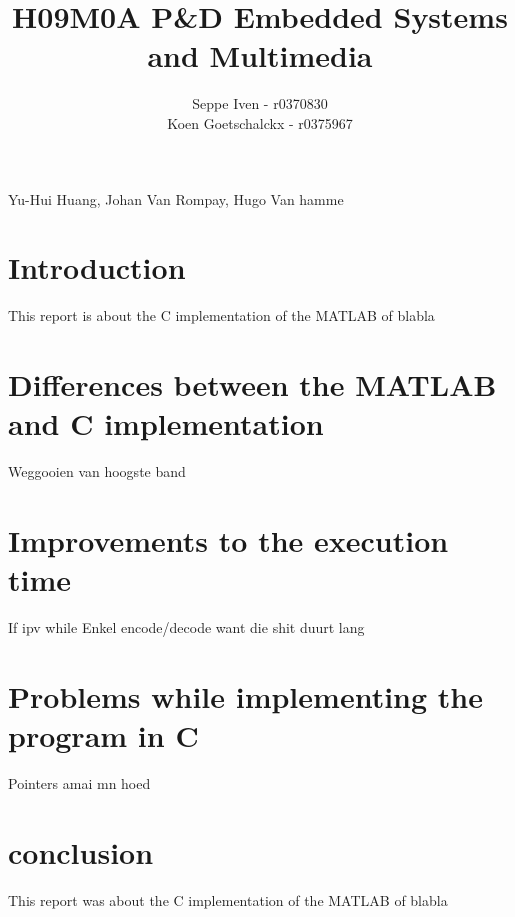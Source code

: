 \documentclass[a4paper]{article}
\title{H09M0A P\&D Embedded Systems and Multimedia}
\author{Seppe Iven - r0370830 \\ Koen Goetschalckx - r0375967}
\begin{document}
 
\maketitle
\begin{center} Yu-Hui Huang, Johan Van Rompay, Hugo Van hamme
\end{center}

\section{Introduction}
This report is about the C implementation of the MATLAB of blabla

\section{Differences between the MATLAB and C implementation}
Weggooien van hoogste band

\section{Improvements to the execution time}
If ipv while
Enkel encode/decode want die shit duurt lang

\section{Problems while implementing the program in C}
Pointers amai mn hoed

\section{conclusion}
This report was about the C implementation of the MATLAB of blabla
\end{document}
